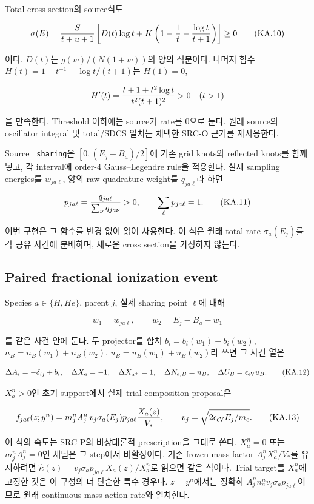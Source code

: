 \documentclass[11pt,a4paper]{article}
\begin{document}
Total cross section의 source식도

\[
 \sigma(E)={S\over t+u+1}\left[D(t)\log t+
     K\left(1-{1\over t}-{\log t\over t+1}\right)\right]\ge0
 \tag{KA.10}
\]

이다. \(D(t)\)는 \(g(w)/(N(1+w))\)의 양의 적분이다. 나머지 함수 \(H(t)=1-t^{-1}-\log t/(t+1)\)는 \(H(1)=0\),

\[
 H'(t)={t+1+t^2\log t\over t^2(t+1)^2}>0\quad(t>1)
\]

을 만족한다. Threshold 이하에는 source가 rate를 0으로 둔다. 원래 source의 oscillator integral 및 total/SDCS 일치는 채택한 SRC-O 근거를 재사용한다.

Source \texttt{\_sharing}은 \([0,(E_j-B_a)/2]\)에 기존 grid knots와 reflected knots를 함께 넣고, 각 interval에 order-4 Gauss--Legendre rule을 적용한다. 실제 sampling energies를 \(w_{ja\ell}\), 양의 raw quadrature weight를 \(q_{ja\ell}\)라 하면

\[
 p_{ja\ell}={q_{ja\ell}\over\sum_\nu q_{ja\nu}}>0,\qquad
 \sum_\ell p_{ja\ell}=1.
 \tag{KA.11}
\]

이번 구현은 그 함수를 변경 없이 읽어 사용한다. 이 식은 원래 total rate \(\sigma_a(E_j)\)를 각 공유 사건에 분배하며, 새로운 cross section을 가정하지 않는다.

\hypertarget{paired-fractional-ionization-event}{%
\subsection{Paired fractional ionization event}\label{paired-fractional-ionization-event}}

Species \(a\in\{H,He\}\), parent \(j\), 실제 sharing point \(\ell\)에 대해

\[
 w_1=w_{ja\ell},\qquad w_2=E_j-B_a-w_1
\]

를 같은 사건 안에 둔다. 두 projector를 합쳐 \(b_i=b_i(w_1)+b_i(w_2)\), \(n_B=n_B(w_1)+n_B(w_2)\), \(u_B=u_B(w_1)+u_B(w_2)\)라 쓰면 그 사건 열은

\[
 \Delta A_i=-\delta_{ij}+b_i,\quad
 \Delta X_a=-1,\quad\Delta X_{a^+}=1,\quad
 \Delta N_{e,B}=n_B,\quad\Delta U_B=\epsilon_{\rm eV}u_B.
 \tag{KA.12}
\]

\(X_a^n>0\)인 초기 support에서 실제 trial composition proposal은

\[
 f_{ja\ell}(z;y^n)=m_j^n A_j^n\,
       v_j\sigma_a(E_j)p_{ja\ell}{X_a(z)\over V_*},\qquad
 v_j=\sqrt{2\epsilon_{\rm eV}E_j/m_e}.
 \tag{KA.13}
\]

이 식의 속도는 SRC-P의 비상대론적 prescription을 그대로 쓴다. \(X_a^n=0\) 또는 \(m_j^nA_j^n=0\)인 채널은 그 step에서 비활성이다. 기존 frozen-mass factor \(A_j^nX_a^n/V_*\)를 유지하려면 \(\widehat\kappa(z)=v_j\sigma_a p_{ja\ell}X_a(z)/X_a^n\)로 읽으면 같은 식이다. Trial target를 \(X_a^n\)에 고정한 것은 이 구성의 더 단순한 특수 경우다. \(z=y^n\)에서는 정확히 \(A_j^n n_a^n v_j\sigma_a p_{ja\ell}\)이므로 원래 continuous mass-action rate와 일치한다.
\end{document}

